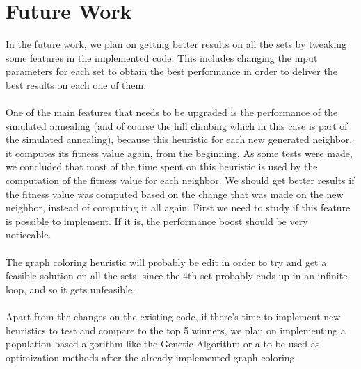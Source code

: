 \chapter{Future Work}
\label{chapter:FutureWork}

In the future work, we plan on getting better results on all the sets by tweaking some features in the implemented code. This includes changing the input parameters for each set to obtain the best performance in order to deliver the best results on each one of them.\\
\\
One of the main features that needs to be upgraded is the performance of the simulated annealing (and of course the hill climbing which in this case is part of the simulated annealing), because this heuristic for each new generated neighbor, it computes its fitness value again, from the beginning. As some tests were made, we concluded that most of the time spent on this heuristic is used by the computation of the fitness value for each neighbor. We should get better results if the fitness value was computed based on the change that was made on the new neighbor, instead of computing it all again. First we need to study if this feature is possible to implement. If it is, the performance boost should be very noticeable.\\
\\
The graph coloring heuristic will probably be edit in order to try and get a feasible solution on all the sets, since the 4th set probably ends up in an infinite loop, and so it gets unfeasible.\\
\\
Apart from the changes on the existing code, if there's time to implement new heuristics to test and compare to the top 5 winners, we plan on implementing a population-based algorithm like the Genetic Algorithm or a  to be used as optimization methods after the already implemented graph coloring.